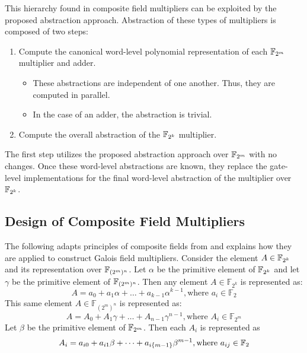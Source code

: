 This hierarchy found in composite field multipliers can be exploited by the proposed 
abstraction approach. Abstraction of these types of multipliers is composed of
two steps:
\begin{enumerate}
\item Compute the canonical word-level polynomial representation of each ${\mathbb{F}}_{2^m}$ multiplier and adder.
\begin{itemize}
  \item These abstractions are independent of one another. Thus, they are computed in parallel.
  \item In the case of an adder, the abstraction is trivial.
\end{itemize}
\item Compute the overall abstraction of the ${\mathbb{F}}_{2^k}$ multiplier.
\end{enumerate}
The first step utilizes the proposed abstraction approach over ${\mathbb{F}}_{2^m}$ with no changes.
Once these word-level abstractions are known, they replace the gate-level
implementations for the final word-level abstraction of the multiplier over ${\mathbb{F}}_{2^k}$.

\subsection{Design of Composite Field Multipliers}

The following adapts principles of composite fields from \cite{phdpaar:1994} and 
explains how they are applied to construct Galois field multipliers.
Consider the element $A \in {\mathbb{F}}_{2^k}$ and its representation over 
${\mathbb{F}}_{(2^m)^n}$. Let $\alpha$ be the primitive element of ${\mathbb{F}}_{2^k}$ and let $\gamma$
be the primitive element of ${\mathbb{F}}_{(2^m)^n}$. Then any element $A \in \mathbb{F}_{2^k}$ 
is represented as:
\begin{equation}
A=a_0+a_1\alpha+\dots+a_{k-1}\alpha^{k-1},\text{where } a_i  \in \mathbb{F}_{2} \label{eqn:compAf2k}
\end{equation}
This same element $A \in \mathbb{F}_{(2^m)^n}$ is represented as:
\begin{equation}
A=A_0+A_1\gamma+\dots+A_{n-1}\gamma^{n-1},\text{where } A_i \in \mathbb{F}_{2^m} \label{eqn:compAf2m}
\end{equation}
Let $\beta$ be the primitive element of ${\mathbb{F}}_{2^m}$. Then each $A_i$ is represented as
\begin{equation}
A_i=a_{i0}+a_{i1}\beta+\dots+a_{i\{m-1\}}\beta^{m-1},\text{where } a_{ij}\in{\mathbb{F}}_2
\end{equation}

